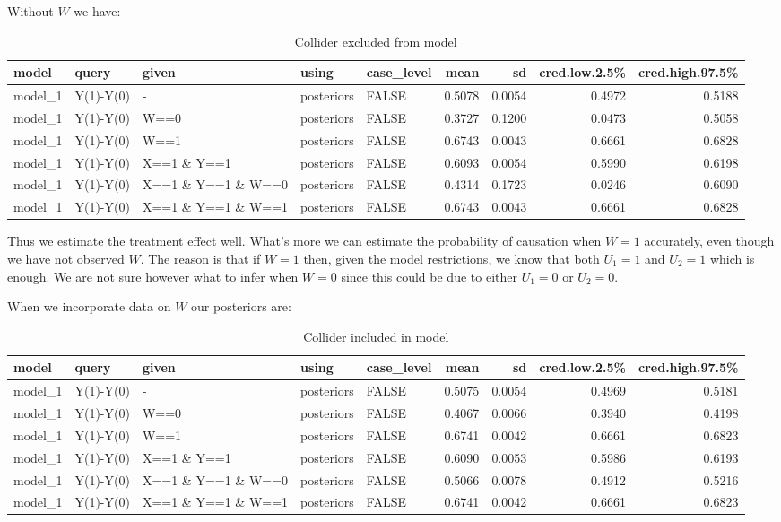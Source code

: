 \documentclass[
  12pt,
]{book}
\begin{document}
Without \(W\) we have:

\begin{table}

\caption{\label{tab:applearncoll6}Collider excluded from model}
\centering
\begin{tabular}[t]{l|l|l|l|l|r|r|r|r}
\hline
model & query & given & using & case\_level & mean & sd & cred.low.2.5\% & cred.high.97.5\%\\
\hline
model\_1 & Y(1)-Y(0) & - & posteriors & FALSE & 0.5078 & 0.0054 & 0.4972 & 0.5188\\
\hline
model\_1 & Y(1)-Y(0) & W==0 & posteriors & FALSE & 0.3727 & 0.1200 & 0.0473 & 0.5058\\
\hline
model\_1 & Y(1)-Y(0) & W==1 & posteriors & FALSE & 0.6743 & 0.0043 & 0.6661 & 0.6828\\
\hline
model\_1 & Y(1)-Y(0) & X==1 \& Y==1 & posteriors & FALSE & 0.6093 & 0.0054 & 0.5990 & 0.6198\\
\hline
model\_1 & Y(1)-Y(0) & X==1 \& Y==1 \& W==0 & posteriors & FALSE & 0.4314 & 0.1723 & 0.0246 & 0.6090\\
\hline
model\_1 & Y(1)-Y(0) & X==1 \& Y==1 \& W==1 & posteriors & FALSE & 0.6743 & 0.0043 & 0.6661 & 0.6828\\
\hline
\end{tabular}
\end{table}

Thus we estimate the treatment effect well. What's more we can estimate the probability of causation when \(W=1\) accurately, even though we have not observed \(W\). The reason is that if \(W=1\) then, given the model restrictions, we know that both \(U_1=1\) and \(U_2=1\) which is enough. We are not sure however what to infer when \(W=0\) since this could be due to either \(U_1=0\) or \(U_2=0\).

When we incorporate data on \(W\) our posteriors are:

\begin{table}

\caption{\label{tab:applearncoll8}Collider included in model}
\centering
\begin{tabular}[t]{l|l|l|l|l|r|r|r|r}
\hline
model & query & given & using & case\_level & mean & sd & cred.low.2.5\% & cred.high.97.5\%\\
\hline
model\_1 & Y(1)-Y(0) & - & posteriors & FALSE & 0.5075 & 0.0054 & 0.4969 & 0.5181\\
\hline
model\_1 & Y(1)-Y(0) & W==0 & posteriors & FALSE & 0.4067 & 0.0066 & 0.3940 & 0.4198\\
\hline
model\_1 & Y(1)-Y(0) & W==1 & posteriors & FALSE & 0.6741 & 0.0042 & 0.6661 & 0.6823\\
\hline
model\_1 & Y(1)-Y(0) & X==1 \& Y==1 & posteriors & FALSE & 0.6090 & 0.0053 & 0.5986 & 0.6193\\
\hline
model\_1 & Y(1)-Y(0) & X==1 \& Y==1 \& W==0 & posteriors & FALSE & 0.5066 & 0.0078 & 0.4912 & 0.5216\\
\hline
model\_1 & Y(1)-Y(0) & X==1 \& Y==1 \& W==1 & posteriors & FALSE & 0.6741 & 0.0042 & 0.6661 & 0.6823\\
\hline
\end{tabular}
\end{table}
\end{document}

